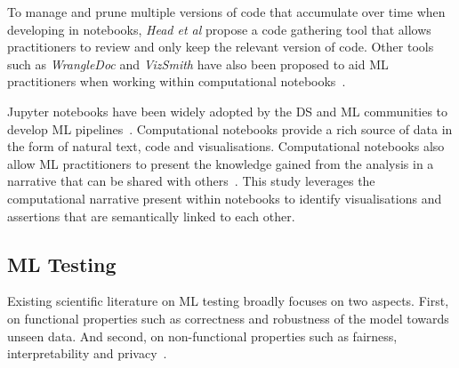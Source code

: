 To manage and prune multiple versions of code that accumulate over time when developing in notebooks, \emph{Head et al} propose a code gathering tool that allows practitioners to review and only keep the relevant version of code. Other tools such as \textit{WrangleDoc} and \textit{VizSmith} have also been proposed to aid ML practitioners when working within computational notebooks~\cite{yang2021subtle, bavishi2021vizsmith}.

Jupyter notebooks have been widely adopted by the DS and ML communities to develop ML pipelines~\cite{wang2020assessing,pimentel2019large-scale,quaranta2021kgtorrent}. Computational notebooks provide a rich source of data in the form of natural text, code and visualisations. Computational notebooks also allow ML practitioners to present the knowledge gained from the analysis in a narrative that can be shared with others~\cite{rule2018exploration}. This study leverages the computational narrative present within notebooks to identify visualisations and assertions that are semantically linked to each other.

\subsection{ML Testing}\label{sec:ml-testing}


Existing scientific literature on ML testing broadly focuses on two aspects. First, on functional properties such as correctness and robustness of the model towards unseen data. And second, on non-functional properties such as fairness, interpretability and privacy~\cite{zhang2020machine,mehrabi2021survey,chen2022fairness}.

